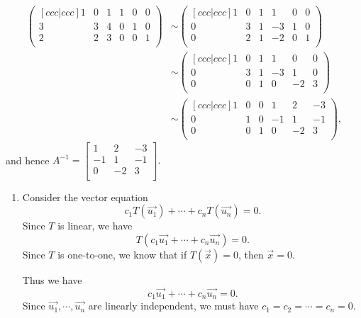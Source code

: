 \documentclass[12pt,letterpaper]{article}
\begin{document}
\begin{enumerate}
\begin{align*}
	\begin{pmatrix}[ccc|ccc]
		1 & 0 & 1 & 1 & 0 & 0\\
		3 &3 & 4 & 0 & 1 & 0\\
		2 &2 & 3 & 0 & 0 &1\\
	\end{pmatrix}& \sim  \begin{pmatrix}[ccc|ccc]
		1 & 0 & 1 & 1 & 0 & 0\\
		0 &3 & 1 & -3 & 1 & 0\\
		0 & 2 & 1 & -2 & 0 &1\\
	\end{pmatrix}\\ &\sim \begin{pmatrix}[ccc|ccc]
		1 & 0 & 1 & 1 & 0 & 0\\
		0 &3 & 1 & -3 & 1 & 0\\
		0 &0 & 1 & 0 & -2 &3\\
	\end{pmatrix}\\ &\sim
\begin{pmatrix}[ccc|ccc]
	1 & 0 & 0 & 1 & 2 &-3 \\
	0 &1 & 0 & -1 & 1 & -1\\
	0 &0 & 1 & 0 & -2 & 3\\
\end{pmatrix},
\end{align*}
and hence $A^{-1}=\begin{bmatrix}
1 & 2 & -3\\
-1 & 1 & -1\\
0 & -2 & 3\\
\end{bmatrix}.$
  
  \Answer 
  
    \begin{enumerate}
  
  \item Consider the vector equation
\begin{equation}
c_1 T(\vec{u_1})+ \cdots + c_n T(\vec{u_n}) = 0.
\end{equation}
Since $T$ is linear, we have 
\begin{equation}
 T(c_1 \vec{u_1}+ \cdots + c_n \vec{u_n}) = 0.
\end{equation}
Since $T$ is one-to-one, we know that if $T(\vec{x})=0$, then $\vec{x}=0$.

Thus we have 
\begin{equation}
 c_1 \vec{u_1}+ \cdots + c_n \vec{u_n} = 0.
\end{equation}
Since $\vec{u_1}, \cdots, \vec{u_n}$ are linearly independent, we must have $c_1=c_2=\cdots=c_n=0$.


\end{enumerate}
\end{enumerate}
\end{document}
